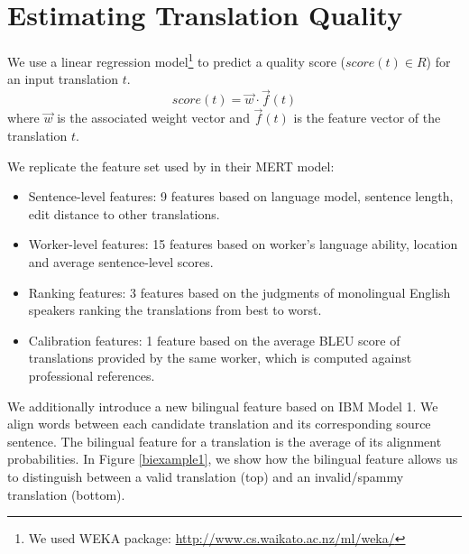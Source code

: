 \documentclass[11pt,letterpaper]{article}
\begin{document}
\section{Estimating Translation Quality}
We use a linear regression model\footnote{We used WEKA package: \url{http://www.cs.waikato.ac.nz/ml/weka/}} to predict a quality score ($ score(t) \in R$) for an input translation $t$.
\[ score(t) = \vec{w}  \cdot \vec f(t) \]
  where $\vec{w}$ is the associated weight vector and $\vec f(t)$ is the feature vector of the translation $t$. 

We replicate the feature set used by  in their MERT model:

\begin{itemize}
\item  Sentence-level features: 9 features based on language model, sentence length, edit distance to other translations. 
\item Worker-level features: 15 features based on worker's language ability, location and average sentence-level scores.
\item Ranking features: 3 features based on the judgments of monolingual English speakers ranking the translations from best to worst.
\item Calibration features: 1 feature based on the average BLEU score of translations provided by the same worker, which is computed against professional references.
\end{itemize}


We additionally introduce a new bilingual feature based on IBM Model 1. We align words between each candidate translation and its corresponding source sentence. The bilingual feature for a translation is the average of its alignment probabilities. In Figure \ref{biexample1}, we show how the bilingual feature allows us to distinguish between a valid translation (top) and an invalid/spammy translation (bottom).
\end{document}
